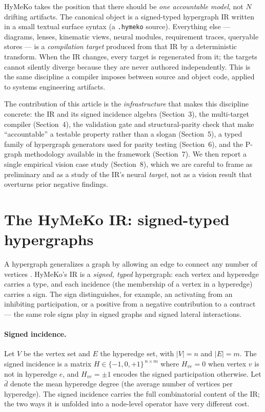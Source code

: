 \documentclass[11pt]{article}
\begin{document}
HyMeKo takes the position that there should be \emph{one accountable model}, not
$N$ drifting artifacts. The canonical object is a signed-typed hypergraph IR
written in a small textual surface syntax (a \texttt{.hymeko} source). Everything
else --- diagrams, lenses, kinematic views, neural modules, requirement traces,
queryable stores --- is a \emph{compilation target} produced from that IR by a
deterministic transform. When the IR changes, every target is regenerated from
it; the targets cannot silently diverge because they are never authored
independently. This is the same discipline a compiler imposes between source and
object code, applied to systems engineering artifacts.

The contribution of this article is the \emph{infrastructure} that makes this
discipline concrete: the IR and its signed incidence algebra (Section~3), the
multi-target compiler (Section~4), the validation gate and structural-parity
check that make ``accountable'' a testable property rather than a slogan
(Section~5), a typed family of hypergraph generators used for parity testing
(Section~6), and the P-graph methodology available in the framework
(Section~7). We then report a single empirical vision case study (Section~8),
which we are careful to frame as preliminary and as a study of the IR's neural
\emph{target}, not as a vision result that overturns prior negative findings.

\section{The HyMeKo IR: signed-typed hypergraphs}
\label{sec:ir}
A hypergraph generalizes a graph by allowing an edge to connect any number of
vertices \cite{berge1973}. HyMeKo's IR is a \emph{signed, typed} hypergraph:
each vertex and hyperedge carries a type, and each incidence (the membership of a
vertex in a hyperedge) carries a sign. The sign distinguishes, for example, an
activating from an inhibiting participation, or a positive from a negative
contribution to a contract --- the same role signs play in signed graphs and
signed lateral interactions.

\paragraph{Signed incidence.}
Let $V$ be the vertex set and $E$ the hyperedge set, with $|V|=n$ and $|E|=m$.
The signed incidence is a matrix $H \in \{-1,0,+1\}^{\,n \times m}$ where
$H_{ve}=0$ when vertex $v$ is not in hyperedge $e$, and $H_{ve}=\pm 1$ encodes the
signed participation otherwise. Let $\bar{d}$ denote the mean hyperedge degree
(the average number of vertices per hyperedge). The signed incidence carries the
full combinatorial content of the IR; the two ways it is unfolded into a
node-level operator have very different cost.
\end{document}
